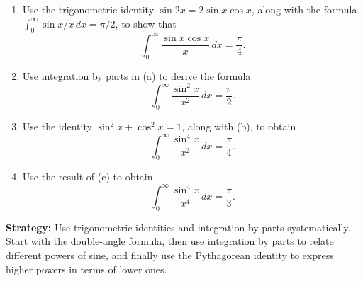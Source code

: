 \begin{problembox}
\begin{problemstatement}
\begin{enumerate}[label=(\alph*)]
\item Use the trigonometric identity $\sin 2x = 2 \sin x \cos x$, along with the formula $\int_{0}^{\infty} \sin x/x \, dx = \pi/2$, to show that
\[\int_{0}^{\infty} \frac{\sin x \cos x}{x} \, dx = \frac{\pi}{4}.\]
\item Use integration by parts in (a) to derive the formula
\[\int_{0}^{\infty} \frac{\sin^2 x}{x^2} \, dx = \frac{\pi}{2}.\]
\item Use the identity $\sin^2 x + \cos^2 x = 1$, along with (b), to obtain
\[\int_{0}^{\infty} \frac{\sin^4 x}{x^2} \, dx = \frac{\pi}{4}.\]
\item Use the result of (c) to obtain
\[\int_{0}^{\infty} \frac{\sin^4 x}{x^4} \, dx = \frac{\pi}{3}.\]
\end{enumerate}
\end{problemstatement}
\end{problembox}

\noindent\textbf{Strategy:} Use trigonometric identities and integration by parts systematically. Start with the double-angle formula, then use integration by parts to relate different powers of sine, and finally use the Pythagorean identity to express higher powers in terms of lower ones.

